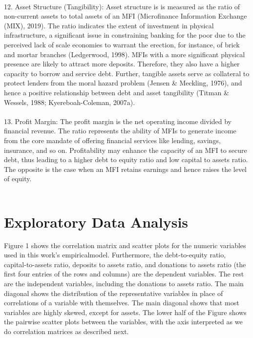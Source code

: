 \documentclass[a4paper, nobind]{templates/ociamthesis}
\begin{document}
\begin{longtabu}
\\
12. Asset Structure (Tangibility): Asset structure is is measured as the ratio of non-current assets to total assets of an MFI (Microfinance Information Exchange (MIX), 2019). The ratio indicates the extent of investment in physical infrastructure, a significant issue in constraining banking for the poor due to the perceived lack of scale economies to warrant the erection, for instance, of brick and mortar branches (Ledgerwood, 1998). MFIs with a more significant physical presence are likely to attract more deposits. Therefore, they also have a higher capacity to borrow and service debt. Further, tangible assets serve as collateral to protect lenders from the moral hazard problem (Jensen \& Meckling, 1976), and hence a positive relationship between debt and asset tangibility (Titman \& Wessels, 1988; Kyereboah-Coleman, 2007a).\\
\addlinespace
\\
13. Profit Margin: The profit margin is the net operating income divided by financial revenue. The ratio represents the ability of MFIs to generate income from the core mandate of offering financial services like lending, savings, insurance, and so on. Profitability may enhance the capacity of an MFI to secure debt, thus leading to a higher debt to equity ratio and low capital to assets ratio. The opposite is the case when an MFI retains earnings and hence raises the level of equity.\\
\\*
\end{longtabu}
\endgroup{}

\hypertarget{exploratory-data-analysis-2}{%
\section{Exploratory Data Analysis}\label{exploratory-data-analysis-2}}

Figure 1 shows the correlation matrix and scatter plots for the numeric variables used in this work's empiricalmodel. Furthermore, the debt-to-equity ratio, capital-to-assets ratio, deposits to assets ratio, and donations to assets ratio (the first four entries of the rows and columns) are the dependent variables. The rest are the independent variables, including the donations to assets ratio. The main diagonal shows the distribution of the representative variables in place of correlations of a variable with themselves. The main diagonal shows that most variables are highly skewed, except for assets. The lower half of the Figure shows the pairwise scatter plots between the variables, with the axis interpreted as we do correlation matrices as described next.
\end{document}
